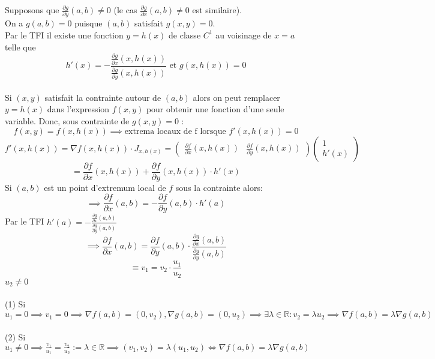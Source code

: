 \documentclass{article}
\begin{document}
Supposons que $ \frac{\partial g}{\partial y}(a, b) \neq 0$ (le cas $\frac{\partial g}{\partial x}(a, b) \neq 0$ est similaire).\\
On a $ g(a, b) = 0$ puisque $(a,b)$ satisfait $g(x, y) = 0$.\\
Par le TFI il existe une fonction $y = h(x)$ de classe $ C^1$ au voisinage de $x = a$ telle que
\[ h'(x) = - \frac{\frac{\partial g}{\partial x}(x, h(x))}{\frac{\partial g}{\partial y}(x, h(x))} \text{ et } g(x, h(x)) = 0 \]\\
Si $(x,y)$ satisfait la contrainte autour de $(a,b)$ alors on peut remplacer $y=h(x)$ dans l'expression $f(x,y)$ pour obtenir une fonction d'une seule variable. Donc, sous contrainte de $g(x,y) = 0$ :
\[ f(x,y) = f(x,h(x)) \implies \text{extrema locaux de f lorsque } f'(x, h(x)) = 0 \]
\[ f'(x,h(x)) = \nabla f(x, h(x)) \cdot J_{x, h(x)} = \begin{pmatrix}
\frac{\partial f}{\partial x}(x, h(x)) & \frac{\partial f}{\partial y}(x, h(x))
\end{pmatrix}\begin{pmatrix}
1 \\
h'(x)
\end{pmatrix} \]
\[ = \frac{\partial f}{\partial x}(x, h(x)) + \frac{\partial f}{\partial y}(x, h(x)) \cdot h'(x) \]
Si $(a,b)$ est un point d'extremum local de $f$ sous la contrainte alors:
\[ \implies \frac{\partial f}{\partial x}(a,b) = - \frac{\partial f}{\partial y}(a,b) \cdot h'(a) \]
Par le TFI $h'(a) = - \frac{\frac{\partial g}{\partial x}(a, b)}{\frac{\partial g}{\partial y}(a, b)} $
\[ \implies \frac{\partial f}{\partial x}(a,b) =  \frac{\partial f}{\partial y}(a,b) \cdot \frac{\frac{\partial g}{\partial x}(a, b)}{\frac{\partial g}{\partial y}(a, b)} \]
\[ \equiv v_1 = v_2 \cdot \frac{u_1}{u_2} \]
$u_2 \neq 0$\\\\
(1) Si $u_1 = 0 \implies v_1 = 0 \implies \nabla f(a,b) = (0, v_2), \nabla g(a,b) = (0, u_2) \implies \exists \lambda \in \mathbb{R} : v_2 = \lambda u_2 \implies \nabla f(a, b) = \lambda \nabla g(a, b) $\\\\
(2) Si $u_1 \neq 0 \implies \frac{v_1}{u_1} = \frac{v_2}{u_2} := \lambda \in \mathbb{R} \implies (v_1, v_2) = \lambda (u_1, u_2) \Leftrightarrow \nabla f(a, b) = \lambda \nabla g(a, b) $
\end{document}
